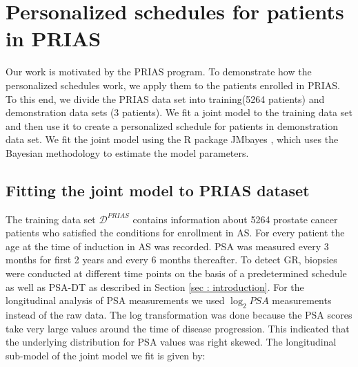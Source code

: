 
\section{Personalized schedules for patients in PRIAS}
\label{sec : pers_schedule_PRIAS}
Our work is motivated by the PRIAS program. To demonstrate how the personalized schedules work, we apply them to the patients enrolled in PRIAS. To this end, we divide the PRIAS data set into training(5264 patients) and demonstration data sets (3 patients). We fit a joint model to the training data set and then use it to create a personalized schedule for patients in demonstration data set. We fit the joint model using the R package JMbayes \citep{rizopoulosJMbayes}, which uses the Bayesian methodology to estimate the model parameters.

\subsection{Fitting the joint model to PRIAS dataset}
\label{subsec : jm_fit_prias}
The training data set $\mathcal{D}^{PRIAS}$ contains information about 5264 prostate cancer patients who satisfied the conditions for enrollment in AS. For every patient the age at the time of induction in AS was recorded. PSA was measured every 3 months for first 2 years and every 6 months thereafter. To detect GR, biopsies were conducted at different time points on the basis of a predetermined schedule as well as PSA-DT as described in Section \ref{sec : introduction}. For the longitudinal analysis of PSA measurements we used $\log_2 PSA$ measurements instead of the raw data. The log transformation was done because the PSA scores take very large values around the time of disease progression. This indicated that the underlying distribution for PSA values was right skewed. The longitudinal sub-model of the joint model we fit is given by:

